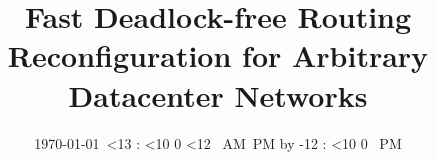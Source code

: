 \documentclass{sig-alternate-10pt}
\def\drafttime{\ifnum \hour<13 \number\hour:%
                      \ifnum \minute<10 0\fi
                      \number\minute
                      \ifnum \hour<12 \ AM\else \ PM\fi
         \else \advance \hour by -12 \number\hour:%
                      \ifnum \minute<10 0\fi
                      \number\minute \ PM\fi}
\def\timestamp{\today \ \drafttime}
\begin{document}

\title{Fast Deadlock-free Routing Reconfiguration for Arbitrary Datacenter Networks}
\author{\timestamp}
\maketitle






%

%

%



\begin{small}


\end{small}
%
\end{document}
